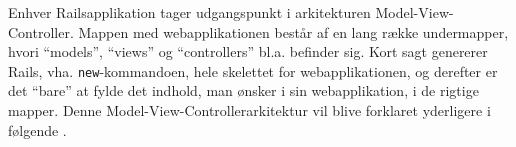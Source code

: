 Enhver Railsapplikation tager udgangspunkt i arkitekturen Model-View-Controller. Mappen med webapplikationen består af en lang række undermapper, hvori ``models'', ``views'' og ``controllers'' bl.a. befinder sig. Kort sagt genererer Rails, vha. \texttt{new}-kommandoen, hele skelettet for webapplikationen, og derefter er det ``bare'' at fylde det indhold, man ønsker i sin webapplikation, i de rigtige mapper. Denne Model-View-Controllerarkitektur vil blive forklaret yderligere i følgende .


